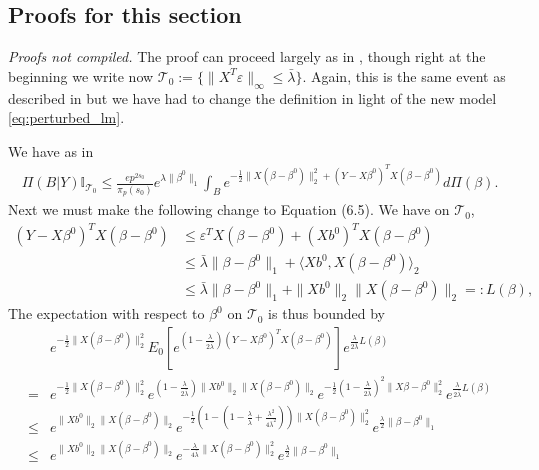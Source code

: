 \documentclass[11pt]{article}
\renewenvironment{proof}[1]{\par\noindent{\bf #1 \ }}{\hfill\BlackBox\\[2mm]}
\renewenvironment{proof}[1]{\textit{Proofs not compiled.}}{}
\newcommand{\eps}{\varepsilon}
\newcommand{\T}{\mathcal{T}}
\newcommand{\bezero}{\beta^0}
\begin{document}
\subsection{Proofs for this section}
\begin{proof}{Proof of Theorem \ref{thm:dimension_no_deconfounding}}
The proof can proceed largely as in \cite{CS-HV2015}, though right at the beginning we write now $\T_0 := \{\|X^T \eps\|_\infty \leq \bar{\lambda}\}$. Again, this is the same event as described in \cite{CS-HV2015} but we have had to change the definition in light of the new model \eqref{eq:perturbed_lm}.

We have as in \cite{CS-HV2015}
\begin{align*}
\Pi(B | Y) \mathbb{I}_{\T_0} \leq \frac{ep^{2s_0}}{\pi_p(s_0)}e^{\lambda\|\bezero\|_1} \int_B e^{-\frac{1}{2}\|X(\beta - \bezero)\|_2^2 + (Y - X \bezero)^T X(\beta - \bezero) }d\Pi(\beta).
\end{align*}
Next we must make the following change to Equation (6.5). We have on $\T_0$,
\begin{align*}
	(Y-X\beta^0)^TX(\beta - \beta^0) &\leq \eps^T X(\beta - \beta^0)+(Xb^0)^TX(\beta - \beta^0) \\
	&\leq \bar{\lambda}\|\beta - \beta^0\|_1 + \langle Xb^0, X(\beta - \beta^0)\rangle_2 \\
	&\leq \bar{\lambda}\|\beta - \beta^0\|_1 + \|Xb^0\|_2 \|X(\beta - \beta^0)\|_2 =: L(\beta),
\end{align*} 
The expectation with respect to $\beta^0$ on $\T_0$ is thus bounded by
\begin{align*}
&e^{-\frac{1}{2} \|X(\beta - \bezero)\|_2^2}	E_{0}\left[ e^{(1-\frac{\lambda}{2\bar{\lambda}})(Y - X \bezero)^T X(\beta - \bezero)}\right]e^{\frac{\lambda}{2\bar{\lambda}}L(\beta)} \\
=& e^{-\frac{1}{2} \|X(\beta - \bezero)\|_2^2}e^{(1-\frac{\lambda}{2\bar{\lambda}})\|Xb^0\|_2 \|X(\beta - \bezero)\|_2}e^{-\frac{1}{2}(1-\frac{\lambda}{2\bar{\lambda}})^2\|X\beta - \bezero\|_2^2}e^{\frac{\lambda}{2\bar{\lambda}}L(\beta)} \\
\leq & e^{\|Xb^0\|_2 \|X(\beta - \bezero)\|_2} e^{-\frac{1}{2} (1 - (1 - \frac{\lambda}{\bar{\lambda}} + \frac{\lambda^2}{4\bar{\lambda}^2}))\|X(\beta - \bezero)\|_2^2}e^{\frac{\lambda}{2}\|\beta - \bezero\|_1} \\
\leq & e^{\|Xb^0\|_2 \|X(\beta - \bezero)\|_2} e^{-\frac{\lambda}{4\bar{\lambda}}\|X(\beta - \bezero)\|_2^2}e^{\frac{\lambda}{2}\|\beta - \bezero\|_1} 
\end{align*} 


\end{proof}
\end{document}
